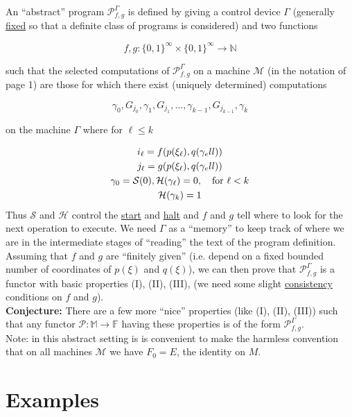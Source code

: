 \documentclass{article}
\newcommand{\scM}{\mathscr{M}}
\newcommand{\scP}{\mathscr{P}}
\newcommand{\ff}{\mathbb{F}}
\newcommand{\mm}{\mathbb{M}}
\newcommand{\nn}{\mathbb{N}}
\begin{document}
An ``abstract'' program $\scP_{f,g}^\Gamma$ is defined by giving a control device $\Gamma$ (generally \underline{fixed} so that a definite class of programs is considered) and two functions 

\begin{equation*}
    f,g : \{0,1\}^\infty \times \{0, 1\}^\infty \to \nn
\end{equation*}

such that the selected computations of $\scP_{f,g}^\Gamma$ on a machine $\scM$ (in the notation of page 1) are those for which there exist (uniquely determined) computations

\begin{equation*}
    \gamma_0, G_{j_0}, \gamma_1, G_{j_1}, \ldots, \gamma_{k-1}, G_{j_{k-1}}, \gamma_k
\end{equation*}

on the machine $\Gamma$ where for $\ell \leq k$

\begin{gather*}
    i_\ell = f(p(\xi_\ell), q(\gamma_ell)) \\ 
    j_\ell = g(p(\xi_\ell), q(\gamma_ell)) \\ 
    \gamma_0 = \mathcal{S}(0), \mathcal{H}(\gamma_\ell) = 0, \text{\quad for } \ell < k \\
    \mathcal{H}(\gamma_k) = 1
\end{gather*}
Thus $\mathcal{S}$ and $\mathcal{H}$ control the \underline{start} and \underline{halt} and $f$ and $g$ tell where to look for the next operation to execute. We need $\Gamma$ as a ``memory'' to keep track of where we are in the intermediate stages of ``reading'' the text of the program definition. Assuming that $f$ and $g$ are ``finitely given'' (i.e. depend on a fixed bounded number of coordinates of $p(\xi)$ and $q(\xi)$), we can then prove that $\scP_{f,g}^\Gamma$ is a functor with basic properties (I), (II), (III), (we need some slight \underline{consistency} conditions on $f$ and $g$). \\

\noindent\textbf{Conjecture:} There are a few more ``nice'' properties (like (I), (II), (III)) such that any functor $\scP: \mm \to \ff$ having these properties is of the form $\scP_{f,g}^\Gamma$. \\

Note: in this abstract setting is is convenient to make the harmless convention that on all machines $\scM$ we have $F_0 = E$, the identity on $M$. 

\section{Examples}
\end{document}
